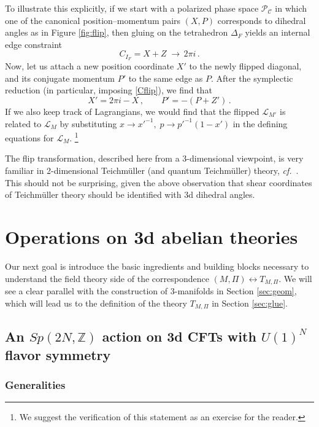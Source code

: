 \documentclass[hyper,letterpaper]{JHEP3}
\numberwithin{equation}{section}
\newcommand{\be}{\begin{equation}}
\newcommand{\ee}{\end{equation}}
\newcommand{\cf}{\emph{cf.}}
\newcommand{\Z}{{\mathbb Z}}
\newcommand{\CC}{\mathcal{C}}
\newcommand{\CL}{\mathcal{L}}
\newcommand{\CP}{\mathcal{P}}
\begin{document}
To illustrate this explicitly, if we start with a polarized phase space $\CP_\CC$ in which one of the canonical position--momentum pairs $(X,P)$ corresponds to dihedral angles as in Figure \ref{fig:flip}, then gluing on the tetrahedron $\Delta_F$ yields an internal edge constraint
%
\be C_{I_F}  = X + Z \;\to\, 2\pi i\,. \label{Cflip} \ee
%
Now, let us attach a new position coordinate $X'$ to the newly flipped diagonal, and its conjugate momentum $P'$ to the same edge as $P$. After the symplectic reduction (in particular, imposing \eqref{Cflip}), we find that
%
\be X' = 2\pi i - X\,,\qquad P' = -(P+Z')\,. \ee
%
If we also keep track of Lagrangians, we would find that the flipped $\CL_{M'}$ is related to $\CL_M$ by substituting $x\to x'^{-1},\; p\to p'^{-1}(1-x')$ in the defining equations for $\CL_M$.%
%
\footnote{We suggest the verification of this statement as an exercise for the reader.}


The flip transformation, described here from a 3-dimensional viewpoint, is very familiar in 2-dimensional Teichm\"uller (and quantum Teichm\"uller) theory, \cf\ \cite{Penner-decorated, Fock-Teich, FockChekhov, Kash-Teich, FG-Teich}. This should not be surprising, given the above observation that shear coordinates of Teichm\"uller theory should be identified with 3d dihedral angles.


\section{Operations on 3d abelian theories}
\label{sec:ops}

Our next goal is introduce the basic ingredients and building blocks necessary to understand the field theory side of the correspondence $(M,\Pi)\leftrightarrow T_{M,\Pi}$. We will see a clear parallel with the construction of 3-manifolds in Section \ref{sec:geom}, which will lead
us to the definition of the theory $T_{M,\Pi}$ in Section \ref{sec:glue}.

\subsection{An $Sp(2N,\Z)$ action on 3d CFTs with $U(1)^N$ flavor symmetry}
\label{sec:dualities}

\subsubsection{Generalities}
\end{document}
